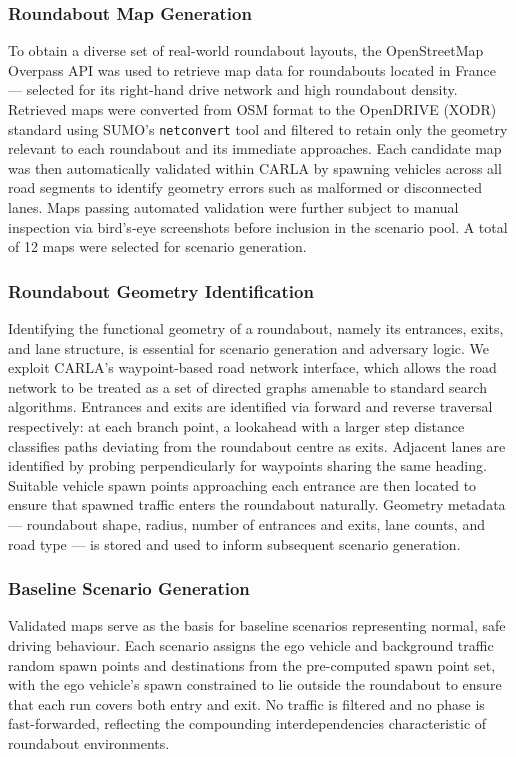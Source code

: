 \subsubsection{Roundabout Map Generation}
To obtain a diverse set of real-world roundabout layouts, the OpenStreetMap Overpass API was used to retrieve map data for roundabouts located in France — selected for its right-hand drive network and high roundabout density. Retrieved maps were converted from OSM format to the OpenDRIVE (XODR) standard using SUMO's \texttt{netconvert} tool and filtered to retain only the geometry relevant to each roundabout and its immediate approaches. Each candidate map was then automatically validated within CARLA by spawning vehicles across all road segments to identify geometry errors such as malformed or disconnected lanes. Maps passing automated validation were further subject to manual inspection via bird's-eye screenshots before inclusion in the scenario pool. A total of 12 maps were selected for scenario generation.

\subsubsection{Roundabout Geometry Identification}
Identifying the functional geometry of a roundabout, namely its entrances, exits, and lane structure, is essential for scenario generation and adversary logic. We exploit CARLA's waypoint-based road network interface, which allows the road network to be treated as a set of directed graphs amenable to standard search algorithms. Entrances and exits are identified via forward and reverse traversal respectively: at each branch point, a lookahead with a larger step distance classifies paths deviating from the roundabout centre as exits. Adjacent lanes are identified by probing perpendicularly for waypoints sharing the same heading. Suitable vehicle spawn points approaching each entrance are then located to ensure that spawned traffic enters the roundabout naturally. Geometry metadata — roundabout shape, radius, number of entrances and exits, lane counts, and road type — is stored and used to inform subsequent scenario generation.

\subsubsection{Baseline Scenario Generation}

Validated maps serve as the basis for baseline scenarios representing normal, safe driving behaviour. Each scenario assigns the ego vehicle and background traffic random spawn points and destinations from the pre-computed spawn point set, with the ego vehicle's spawn constrained to lie outside the roundabout to ensure that each run covers both entry and exit. No traffic is filtered and no phase is fast-forwarded, reflecting the compounding interdependencies characteristic of roundabout environments.

